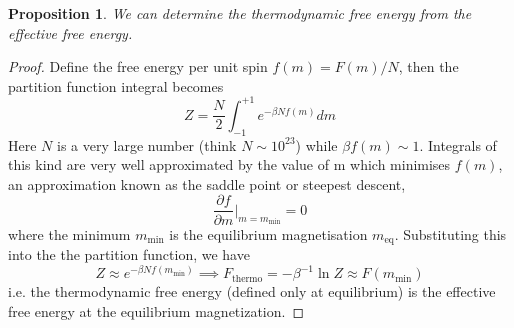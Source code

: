 \documentclass[a4paper]{article}
\theoremstyle{new}
\newtheorem{prop}{Proposition}[section]
\begin{document}
\begin{prop}
We can determine the thermodynamic free energy from the effective free energy. 
\end{prop}
\begin{proof}
Define the free energy per unit spin $f(m)=F(m)/N$, then the partition function integral becomes
$$Z=\frac{N}{2}\int_{-1}^{+1}e^{-\beta Nf(m)}dm$$
Here $N$ is a very large number (think $N\sim 10^{23}$) while $\beta f(m)\sim 1$. Integrals of this kind are very well approximated by the value of m which minimises $f(m)$, an approximation known as the saddle point or steepest descent,
$$\frac{\partial f}{\partial m}\bigg|_{m=m_{\text{min}}}=0$$
where the minimum $m_{\text{min}}$ is the equilibrium magnetisation $m_{\text{eq}}$. Substituting this into the the partition function, we have
$$Z\approx e^{-\beta Nf(m_{\text{min}})}\implies F_{\text{thermo}}=-\beta^{-1}\ln Z\approx F(m_{\text{min}})$$
i.e. the thermodynamic free energy (defined only at equilibrium) is the effective free energy at the equilibrium magnetization.
\end{proof}
\end{document}
